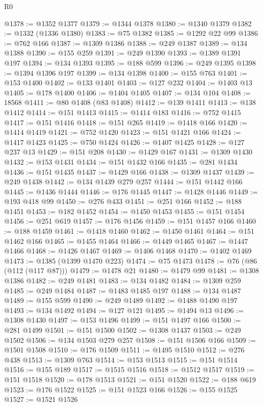 \begin{lexlean}{R0}
\begin{coremodule}
@1378 := @1352 @1377
@1379 := @1344 @1378
@1380 := @1340 @1379
@1382 := @1332 (@1336 @1380)
@1383 := @75 @1382
@1385 := @1292 @22 @99
@1386 := @762 @166
@1387 := @1309 @1386
@1388 := @249 @1387
@1389 := @134 @1388
@1390 := @155 @259
@1391 := @249 @1390
@1393 := @1389 @1391 @197
@1394 := @134 @1393
@1395 := @188 @599
@1396 := @249 @1395
@1398 := @1394 @1396 @197
@1399 := @134 @1398
@1400 := @155 @763
@1401 := @153 @1400
@1402 := @133 @1401
@1403 := @127 @232
@1404 := @1403 @13
@1405 := @178 @1400
@1406 := @1404 @1405
@1407 := @134 @104
@1408 := 18568
@1411 := @80 @1408 (@83 @1408)
@1412 := @139 @1411
@1413 := @138 @1412
@1414 := @151 @1413
@1415 := @1414 @183
@1416 := @752 @1415
@1417 := @151 @1416
@1418 := @151 @265
@1419 := @1418 @166
@1420 := @1414 @1419
@1421 := @752 @1420
@1423 := @151 @1421 @166
@1424 := @1417 @1423
@1425 := @750 @1424
@1426 := @1407 @1425
@1428 := @127 @237 @13
@1429 := @151 @208
@1430 := @1429 @167
@1431 := @1309 @1430
@1432 := @153 @1431
@1434 := @151 @1432 @166
@1435 := @281 @1434
@1436 := @151 @1435
@1437 := @1429 @166
@1438 := @1309 @1437
@1439 := @249 @1438
@1442 := @134 @1439 @279 @257
@1444 := @151 @1442 @166
@1445 := @1436 @1444
@1446 := @176 @1445
@1447 := @1428 @1446
@1449 := @193 @418 @99
@1450 := @276 @433
@1451 := @251 @166
@1452 := @188 @1451
@1453 := @182 @1452
@1454 := @1450 @1453
@1455 := @151 @1454
@1456 := @251 @619
@1457 := @176 @1456
@1459 := @151 @1457 @166
@1460 := @188 @1459
@1461 := @1418 @1460
@1462 := @1450 @1461
@1464 := @151 @1462 @166
@1465 := @1455 @1464
@1466 := @1449 @1465
@1467 := @1447 @1466
@1468 := @1426 @1467
@1469 := @1406 @1468
@1470 := @1402 @1469
@1473 := @1385 (@1399 @1470 @223)
@1474 := @75 @1473
@1478 := @76 (@86 (@112 (@117 @87)))
@1479 := @1478 @21
@1480 := @1479 @99
@1481 := @1308 @1386
@1482 := @249 @1481
@1483 := @134 @1482
@1484 := @1309 @259
@1485 := @249 @1484
@1487 := @1483 @1485 @197
@1488 := @134 @1487
@1489 := @155 @599
@1490 := @249 @1489
@1492 := @1488 @1490 @197
@1493 := @134 @1492
@1494 := @127 @121
@1495 := @1494 @13
@1496 := @1308 @1430
@1497 := @153 @1496
@1499 := @151 @1497 @166
@1500 := @281 @1499
@1501 := @151 @1500
@1502 := @1308 @1437
@1503 := @249 @1502
@1506 := @134 @1503 @279 @257
@1508 := @151 @1506 @166
@1509 := @1501 @1508
@1510 := @176 @1509
@1511 := @1495 @1510
@1512 := @276 @438
@1513 := @1309 @763
@1514 := @153 @1513
@1515 := @151 @1514
@1516 := @155 @189
@1517 := @1515 @1516
@1518 := @1512 @1517
@1519 := @151 @1518
@1520 := @178 @1513
@1521 := @151 @1520
@1522 := @188 @619
@1523 := @176 @1522
@1525 := @151 @1523 @166
@1526 := @155 @1525
@1527 := @1521 @1526

\end{coremodule}
\end{lexlean}
